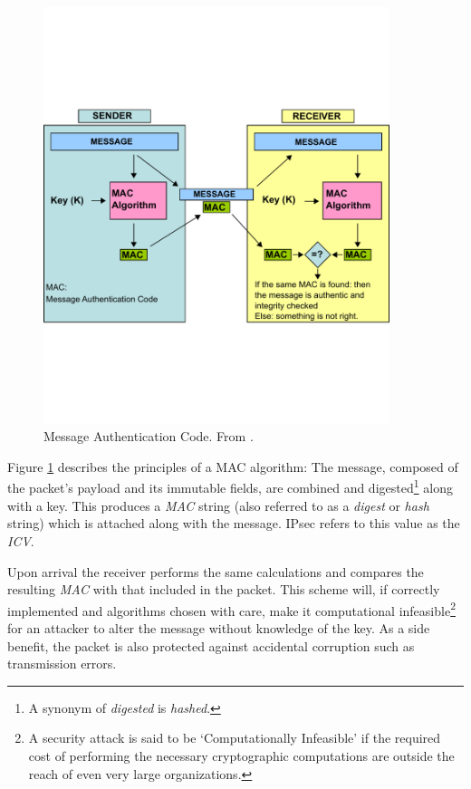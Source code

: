 \documentclass[final,a4paper,twoside,11pt,onecolumn]{report}
\begin{document}
\begin{figure}[h!]
   \includegraphics[width=0.9\textwidth, trim=0 205 0 210]{wiki-mac}
   \caption{Message Authentication Code. From \cite{wiki:mac}.}
   \label{fig:wiki-mac}
\end{figure}

Figure \ref{fig:wiki-mac} describes the principles of a MAC algorithm: The message, composed of the packet's payload and its immutable fields, are combined and digested\footnote{A synonym of \emph{digested} is \emph{hashed}.} along with a key. This produces a \emph{MAC} string (also referred to as a \emph{digest} or \emph{hash} string) which is attached along with the message. IPsec refers to this value as the \emph{ICV}.

Upon arrival the receiver performs the same calculations and compares the resulting \emph{MAC} with that included in the packet. This scheme will, if correctly implemented and algorithms chosen with care, make it computational infeasible\footnote{A security attack is said to be `Computationally Infeasible' if the required cost of performing the necessary cryptographic computations are outside the reach of even very large organizations.} for an attacker to alter the message without knowledge of the key. As a side benefit, the packet is also protected against accidental corruption such as transmission errors.
\end{document}
